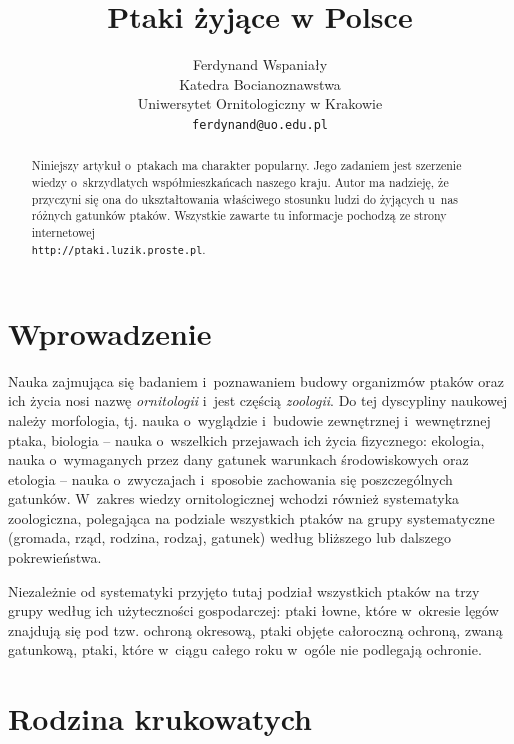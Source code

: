 \documentclass[a4paper,10pt]{article}
\title{Ptaki żyjące w Polsce}
\author{Ferdynand Wspaniały\\
\small Katedra Bocianoznawstwa\\
\small Uniwersytet Ornitologiczny w Krakowie\\
\small \texttt{ferdynand@uo.edu.pl}\\
}
\date{} %
\begin{document}
\maketitle

%


\begin{abstract}
Niniejszy artykuł o~ptakach ma charakter popularny. Jego zadaniem jest szerzenie wiedzy o~skrzydlatych współmieszkańcach naszego kraju. Autor ma nadzieję, że przyczyni się ona do ukształtowania właściwego stosunku ludzi do żyjących u~nas różnych gatunków ptaków. Wszystkie zawarte tu informacje pochodzą ze strony internetowej\\ \texttt{http://ptaki.luzik.proste.pl}.
\end{abstract}


\section{Wprowadzenie}
\label{sec:wprowadzenie}

Nauka zajmująca się badaniem i~poznawaniem budowy organizmów ptaków oraz ich życia nosi nazwę \emph{ornitologii} i~jest częścią \emph{zoologii}. Do tej dyscypliny naukowej należy morfologia, tj. nauka o~wyglądzie i~budowie zewnętrznej i~wewnętrznej ptaka, biologia -- nauka o~wszelkich przejawach ich życia fizycznego: ekologia, nauka o~wymaganych przez dany gatunek warunkach środowiskowych oraz etologia -- nauka o~zwyczajach i~sposobie zachowania się poszczególnych gatunków. W~zakres wiedzy ornitologicznej wchodzi również systematyka zoologiczna, polegająca na podziale wszystkich ptaków na grupy systematyczne (gromada, rząd, rodzina, rodzaj, gatunek) według bliższego lub dalszego pokrewieństwa. 

Niezależnie od systematyki przyjęto tutaj podział wszystkich ptaków na trzy grupy według ich użyteczności gospodarczej: ptaki łowne, które w~okresie lęgów znajdują się pod tzw. ochroną okresową, ptaki objęte całoroczną ochroną, zwaną gatunkową, ptaki, które w~ciągu całego roku w~ogóle nie podlegają ochronie.


\section{Rodzina krukowatych}
\label{sec:rodzinakrukowatych}
\end{document}
